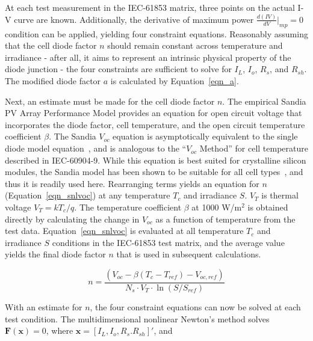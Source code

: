 \documentclass[12pt,letterpaper]{article}
\begin{document}
At each test measurement in the IEC-61853 matrix, three points on the actual I-V curve are known.  Additionally, the derivative of maximum power $\frac{d(IV)}{dV}|_{mp}=0$ condition can be applied, yielding four constraint equations.  Reasonably assuming that the cell diode factor $n$ should remain constant across temperature and irradiance - after all, it aims to represent an intrinsic physical property of the diode junction - the four constraints are sufficient to solve for $I_L$, $I_o$, $R_s$, and $R_{sh}$.  The modified diode factor $a$ is calculated by Equation~\ref{eqn_a}.

Next, an estimate must be made for the cell diode factor $n$.  The empirical Sandia PV Array Performance Model provides an equation for open circuit voltage that incorporates the diode factor, cell temperature, and the open circuit temperature coefficient $\beta$.  The Sandia $V_{oc}$ equation is asymptotically equivalent to the single diode model equation~\cite{hansen2013}, and is analogous to the ``$V_{oc}$ Method'' for cell temperature described in IEC-60904-9.  While this equation is best suited for crystalline silicon modules, the Sandia model has been shown to be suitable for all cell types~\cite{sapm}, and thus it is readily used here.  Rearranging terms yields an equation for $n$ (Equation~\ref{eqn_snlvoc}) at any temperature $T_c$ and irradiance $S$.  $V_T$ is thermal voltage $V_T=kT_c/q$.  The temperature coefficient $\beta$ at 1000 W/m$^2$ is obtained directly by calculating the change in $V_{oc}$ as a function of temperature from the test data.  Equation~\ref{eqn_snlvoc} is evaluated at all temperature $T_c$ and irradiance $S$ conditions in the IEC-61853 test matrix, and the average value yields the final diode factor $n$ that is used in subsequent calculations.

\begin{equation}\label{eqn_snlvoc}
n = \frac{ (V_{oc} - \beta( T_c - T_{ref} ) - V_{oc,ref}) }
            { N_s \cdot V_T \cdot \ln( S/S_{ref} ) }
\end{equation}

With an estimate for $n$, the four constraint equations can now be solved at each test condition.  The multidimensional nonlinear Newton's method solves $\mathbf{F}(\mathbf{x})=0$, where $\mathbf{x} = \left[ I_L,  I_o, R_s. R_{sh} \right]'$, and 
\end{document}
